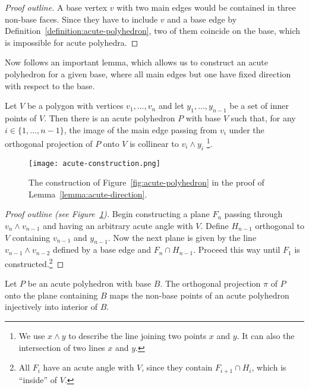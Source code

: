 \begin{proof}[Proof outline]
  A base vertex $v$ with two main edges would be contained in three non-base faces. Since they have to include $v$ and a base edge by Definition~\ref{definition:acute-polyhedron}, two of them coincide on the base, which is impossible for acute polyhedra.
\end{proof}

Now follows an important lemma, which allows us to construct an acute polyhedron for a given base, where all main edges but one have fixed direction with respect to the base.

\begin{lemma}\label{lemma:acute-direction}
  Let $V$ be a polygon with vertices $v_1,\dots,v_n$ and let $y_1,\dots,y_{n-1}$ be a set of inner points of $V$.
  Then there is an acute polyhedron $P$ with base $V$ such that, for any $i \in \{1,\dots,n-1\}$, the image of the main edge passing from $v_i$ under the orthogonal projection of $P$ onto $V$ is collinear to $v_i \wedge y_i$ \footnote{We use $x \wedge y$ to describe the line joining two points $x$ and $y$. It can also the intersection of two lines $x$ and $y$.}.
\end{lemma}

\begin{figure}[h]
  \centering
  \texttt{[image: acute-construction.png]}
  \caption{The construction of Figure~\ref{fig:acute-polyhedron} in the proof of Lemma~\ref{lemma:acute-direction}.}
  \label{fig:acute-construction}
\end{figure}

\begin{proof}[Proof outline (see Figure~\ref{fig:acute-construction})]
  Begin constructing a plane $F_n$ passing through $v_n \wedge v_{n-1}$ and having an arbitrary acute angle with $V$. Define $H_{n-1}$ orthogonal to $V$ containing $v_{n-1}$ and $y_{n-1}$. Now the next plane is given by the line $v_{n-1} \wedge v_{n-2}$  defined by a base edge and $F_n \cap H_{n-1}$. Proceed this way until $F_1$ is constructed.\footnote{All $F_i$ have an acute angle with $V$, since they contain $F_{i+1} \cap H_i$, which is ``inside'' of $V$.}
\end{proof}

\begin{observation}\label{observation:acute-projection}
  Let $P$ be an acute polyhedron with base $B$.
  The orthogonal projection $\pi$ of $P$ onto the plane containing $B$ maps the non-base points of an acute polyhedron injectively into interior of $B$.
\end{observation}

